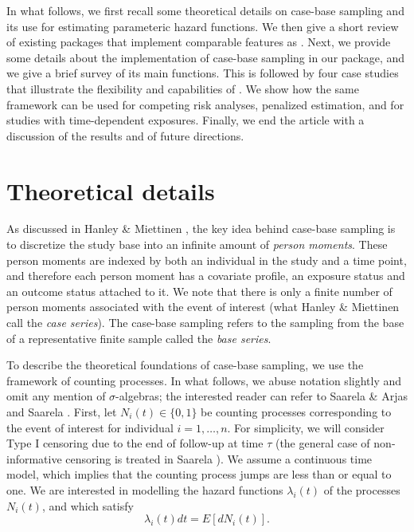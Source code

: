 \documentclass[
]{jss}
\begin{document}
In what follows, we first recall some theoretical details on case-base
sampling and its use for estimating parameteric hazard functions. We
then give a short review of existing  packages that
implement comparable features as . Next, we provide some
details about the implementation of case-base sampling in our package,
and we give a brief survey of its main functions. This is followed by
four case studies that illustrate the flexibility and capabilities of
. We show how the same framework can be used for competing
risk analyses, penalized estimation, and for studies with time-dependent
exposures. Finally, we end the article with a discussion of the results
and of future directions.

\hypertarget{theoretical-details}{%
\section{Theoretical details}\label{theoretical-details}}

As discussed in Hanley \& Miettinen \citeyearpar{hanley2009fitting}, the
key idea behind case-base sampling is to discretize the study base into
an infinite amount of \emph{person moments}. These person moments are
indexed by both an individual in the study and a time point, and
therefore each person moment has a covariate profile, an exposure status
and an outcome status attached to it. We note that there is only a
finite number of person moments associated with the event of interest
(what Hanley \& Miettinen call the \emph{case series}). The case-base
sampling refers to the sampling from the base of a representative finite
sample called the \emph{base series}.

To describe the theoretical foundations of case-base sampling, we use
the framework of counting processes. In what follows, we abuse notation
slightly and omit any mention of \(\sigma\)-algebras; the interested
reader can refer to Saarela \& Arjas \citeyearpar{saarela2015non} and
Saarela \citeyearpar{saarela2016case}. First, let
\(N_{i}(t) \in \{0, 1\}\) be counting processes corresponding to the
event of interest for individual \(i=1, \ldots,n\). For simplicity, we
will consider Type I censoring due to the end of follow-up at time
\(\tau\) (the general case of non-informative censoring is treated in
Saarela \citeyearpar{saarela2016case}). We assume a continuous time
model, which implies that the counting process jumps are less than or
equal to one. We are interested in modelling the hazard functions
\(\lambda_{i}(t)\) of the processes \(N_i(t)\), and which satisfy
\[\lambda_{i}(t) dt = E[dN_{i}(t)].\]
\end{document}
